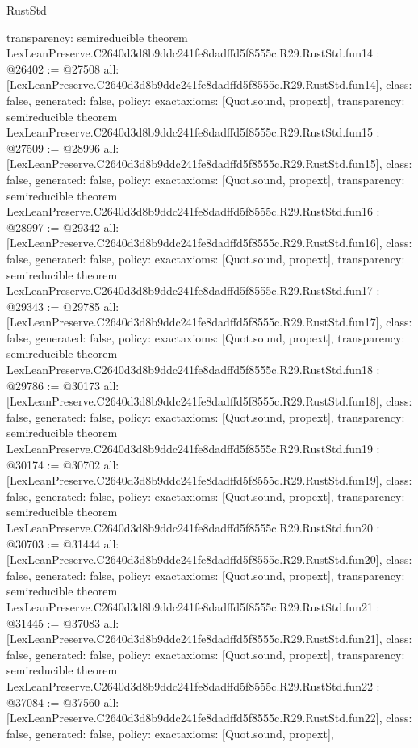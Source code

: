 \begin{lexlean}{RustStd}
\begin{coremodule}
{  transparency: semireducible
}
theorem LexLeanPreserve.C2640d3d8b9ddc241fe8dadffd5f8555c.R29.RustStd.fun14 : @26402 := @27508 {
  all: [LexLeanPreserve.C2640d3d8b9ddc241fe8dadffd5f8555c.R29.RustStd.fun14],
  class: false,
  generated: false,
  policy: exact{axioms: [Quot.sound, propext]},
  transparency: semireducible
}
theorem LexLeanPreserve.C2640d3d8b9ddc241fe8dadffd5f8555c.R29.RustStd.fun15 : @27509 := @28996 {
  all: [LexLeanPreserve.C2640d3d8b9ddc241fe8dadffd5f8555c.R29.RustStd.fun15],
  class: false,
  generated: false,
  policy: exact{axioms: [Quot.sound, propext]},
  transparency: semireducible
}
theorem LexLeanPreserve.C2640d3d8b9ddc241fe8dadffd5f8555c.R29.RustStd.fun16 : @28997 := @29342 {
  all: [LexLeanPreserve.C2640d3d8b9ddc241fe8dadffd5f8555c.R29.RustStd.fun16],
  class: false,
  generated: false,
  policy: exact{axioms: [Quot.sound, propext]},
  transparency: semireducible
}
theorem LexLeanPreserve.C2640d3d8b9ddc241fe8dadffd5f8555c.R29.RustStd.fun17 : @29343 := @29785 {
  all: [LexLeanPreserve.C2640d3d8b9ddc241fe8dadffd5f8555c.R29.RustStd.fun17],
  class: false,
  generated: false,
  policy: exact{axioms: [Quot.sound, propext]},
  transparency: semireducible
}
theorem LexLeanPreserve.C2640d3d8b9ddc241fe8dadffd5f8555c.R29.RustStd.fun18 : @29786 := @30173 {
  all: [LexLeanPreserve.C2640d3d8b9ddc241fe8dadffd5f8555c.R29.RustStd.fun18],
  class: false,
  generated: false,
  policy: exact{axioms: [Quot.sound, propext]},
  transparency: semireducible
}
theorem LexLeanPreserve.C2640d3d8b9ddc241fe8dadffd5f8555c.R29.RustStd.fun19 : @30174 := @30702 {
  all: [LexLeanPreserve.C2640d3d8b9ddc241fe8dadffd5f8555c.R29.RustStd.fun19],
  class: false,
  generated: false,
  policy: exact{axioms: [Quot.sound, propext]},
  transparency: semireducible
}
theorem LexLeanPreserve.C2640d3d8b9ddc241fe8dadffd5f8555c.R29.RustStd.fun20 : @30703 := @31444 {
  all: [LexLeanPreserve.C2640d3d8b9ddc241fe8dadffd5f8555c.R29.RustStd.fun20],
  class: false,
  generated: false,
  policy: exact{axioms: [Quot.sound, propext]},
  transparency: semireducible
}
theorem LexLeanPreserve.C2640d3d8b9ddc241fe8dadffd5f8555c.R29.RustStd.fun21 : @31445 := @37083 {
  all: [LexLeanPreserve.C2640d3d8b9ddc241fe8dadffd5f8555c.R29.RustStd.fun21],
  class: false,
  generated: false,
  policy: exact{axioms: [Quot.sound, propext]},
  transparency: semireducible
}
theorem LexLeanPreserve.C2640d3d8b9ddc241fe8dadffd5f8555c.R29.RustStd.fun22 : @37084 := @37560 {
  all: [LexLeanPreserve.C2640d3d8b9ddc241fe8dadffd5f8555c.R29.RustStd.fun22],
  class: false,
  generated: false,
  policy: exact{axioms: [Quot.sound, propext]},
}
\end{coremodule}
\end{lexlean}
